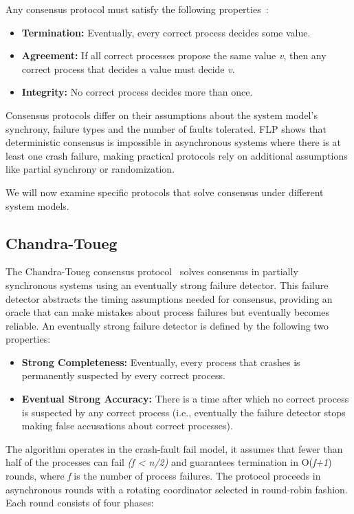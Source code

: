 Any consensus protocol must satisfy the following properties~\cite{distributed_systems_concepts}:
\begin{itemize}
  \item \textbf{Termination:} Eventually, every correct process decides some value.
  \item \textbf{Agreement:} If all correct processes propose the same value \textit{v}, 
then any correct process that decides a value must decide \textit{v}.
  \item \textbf{Integrity:} No correct process decides more than once.
\end{itemize}

Consensus protocols differ on their assumptions about the system model's synchrony,
failure types and the number of faults
tolerated. FLP shows that deterministic consensus is 
impossible in asynchronous systems where there is at least one crash failure, making practical protocols
rely on additional assumptions like partial synchrony or randomization.

We will now examine specific protocols that solve consensus under different system models.

\subsection{Chandra-Toueg}\label{sub:chandra-toueg}

The Chandra-Toueg consensus protocol~\cite{chandra} solves consensus in partially synchronous
systems using an eventually strong failure detector.
This failure detector abstracts the timing assumptions needed for consensus, providing
an oracle that can make mistakes about process failures but eventually becomes reliable.
An eventually strong failure detector is defined by the following two properties:
\begin{itemize}
  \item \textbf{Strong Completeness:} Eventually, every process that crashes is permanently
  suspected by every correct process.
  \item \textbf{Eventual Strong Accuracy:} There is a time after which no correct process
  is suspected by any correct process (i.e., eventually the failure detector stops making
  false accusations about correct processes).
\end{itemize}

The algorithm operates in the crash-fault fail model, it assumes that fewer than half of the
processes can fail \textit{(f < n/2)} and guarantees termination in O(\textit{f+1})
rounds, where \textit{f} is the number of process failures. The protocol proceeds
in asynchronous rounds with a rotating coordinator selected in round-robin fashion. Each round consists of four phases:

